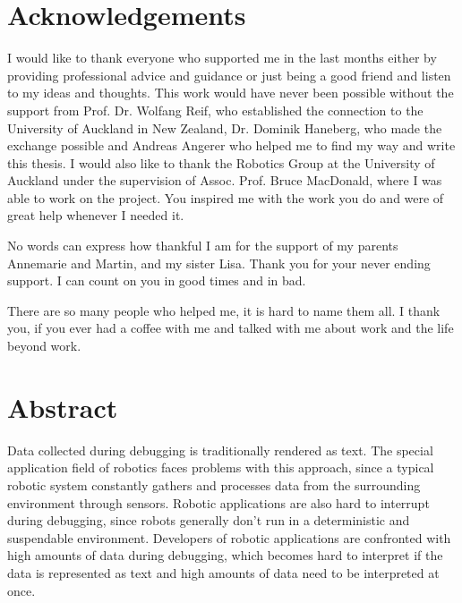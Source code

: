 \documentclass[12pt,a4paper,headsepline,footsepline,DIV13,BCOR12mm]{scrbook}
\begin{document}
 
\newpage

\renewcommand{\baselinestretch}{2} %


\chapter*{Acknowledgements}
I would like to thank everyone who supported me in the last months either by providing professional advice and guidance or just being a good friend and listen to my ideas and thoughts. This work would have never been possible without the support from Prof. Dr. Wolfang Reif, who established the connection to the University of Auckland in New Zealand, Dr. Dominik Haneberg, who made the exchange possible and Andreas Angerer who helped me to find my way and write this thesis. I would also like to thank the Robotics Group at the University of Auckland under the supervision of Assoc. Prof. Bruce MacDonald, where I was able to work on the project. You inspired me with the work you do and were of great help whenever I needed it.

No words can express how thankful I am for the support of my parents Annemarie and Martin, and my sister Lisa. Thank you for your never ending support. I can count on you in good times and in bad.

There are so many people who helped me, it is hard to name them all. I thank you, if you ever had a coffee with me and talked with me about work and the life beyond work.

\newpage
\chapter*{Abstract}
Data collected during debugging is traditionally rendered as text. The special application field of robotics faces problems with this approach, since a typical robotic system constantly gathers and processes data from the surrounding environment through sensors. Robotic applications are also hard to interrupt during debugging, since robots generally don't run in a deterministic and suspendable environment. Developers of robotic applications are confronted with high amounts of data during debugging, which becomes hard to interpret if the data is represented as text and high amounts of data need to be interpreted at once.
\end{document}
